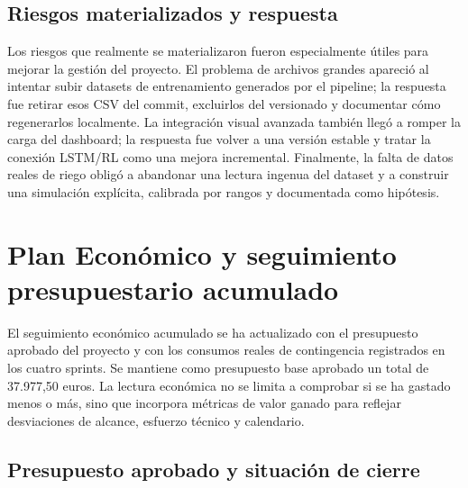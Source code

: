 \documentclass[11pt,a4paper]{article}
\begin{document}
\subsection{Riesgos materializados y respuesta}

Los riesgos que realmente se materializaron fueron especialmente útiles para mejorar la gestión del proyecto. El problema de archivos grandes apareció al intentar subir datasets de entrenamiento generados por el pipeline; la respuesta fue retirar esos CSV del commit, excluirlos del versionado y documentar cómo regenerarlos localmente. La integración visual avanzada también llegó a romper la carga del dashboard; la respuesta fue volver a una versión estable y tratar la conexión LSTM/RL como una mejora incremental. Finalmente, la falta de datos reales de riego obligó a abandonar una lectura ingenua del dataset y a construir una simulación explícita, calibrada por rangos y documentada como hipótesis.

\newpage

\section{Plan Económico y seguimiento presupuestario acumulado}

El seguimiento económico acumulado se ha actualizado con el presupuesto aprobado del proyecto y con los consumos reales de contingencia registrados en los cuatro sprints. Se mantiene como presupuesto base aprobado un total de 37.977,50 euros. La lectura económica no se limita a comprobar si se ha gastado menos o más, sino que incorpora métricas de valor ganado para reflejar desviaciones de alcance, esfuerzo técnico y calendario.

\subsection{Presupuesto aprobado y situación de cierre}
\end{document}

